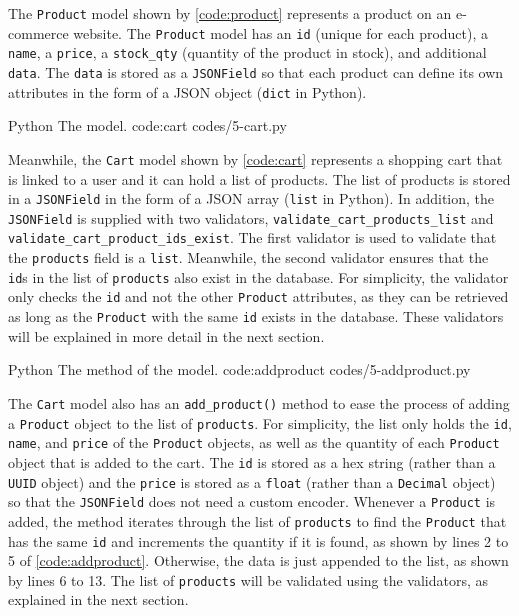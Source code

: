 The \verb|Product| model shown by \autoref{code:product} represents a product
on an e-commerce website. The \verb|Product| model has an \verb|id| (unique for
each product), a \verb|name|, a \verb|price|, a \verb|stock_qty| (quantity of
the product in stock), and additional \verb|data|. The \verb|data| is stored as
a \verb|JSONField| so that each product can define its own attributes in the
form of a JSON object (\verb|dict| in Python).

\listing
{Python}
{The  model.}
{code:cart}
{codes/5-cart.py}

Meanwhile, the \verb|Cart| model shown by \autoref{code:cart} represents a
shopping cart that is linked to a user and it can hold a list of products. The
list of products is stored in a \verb|JSONField| in the form of a JSON array
(\verb|list| in Python). In addition, the \verb|JSONField| is supplied with two
validators, \verb|validate_cart_products_list| and
\verb|validate_cart_product_ids_exist|. The first validator is used to validate
that the \verb|products| field is a \verb|list|. Meanwhile, the second
validator ensures that the \verb|id|s in the list of \verb|products| also exist
in the database. For simplicity, the validator only checks the \verb|id| and
not the other \verb|Product| attributes, as they can be retrieved as long as
the \verb|Product| with the same \verb|id| exists in the database. These
validators will be explained in more detail in the next section.

\listing
{Python}
{The  method of the  model.}
{code:addproduct}
{codes/5-addproduct.py}

The \verb|Cart| model also has an \verb|add_product()| method to ease the
process of adding a \verb|Product| object to the list of \verb|products|. For
simplicity, the list only holds the \verb|id|, \verb|name|, and \verb|price| of
the \verb|Product| objects, as well as the quantity of each \verb|Product|
object that is added to the cart. The \verb|id| is stored as a hex string
(rather than a \verb|UUID| object) and the \verb|price| is stored as a
\verb|float| (rather than a \verb|Decimal| object) so that the \verb|JSONField|
does not need a custom encoder. Whenever a \verb|Product| is added, the method
iterates through the list of \verb|products| to find the \verb|Product| that
has the same \verb|id| and increments the quantity if it is found, as shown by
lines 2 to 5 of \autoref{code:addproduct}. Otherwise, the data is just
appended to the list, as shown by lines 6 to 13. The list of \verb|products|
will be validated using the validators, as explained in the next section.

